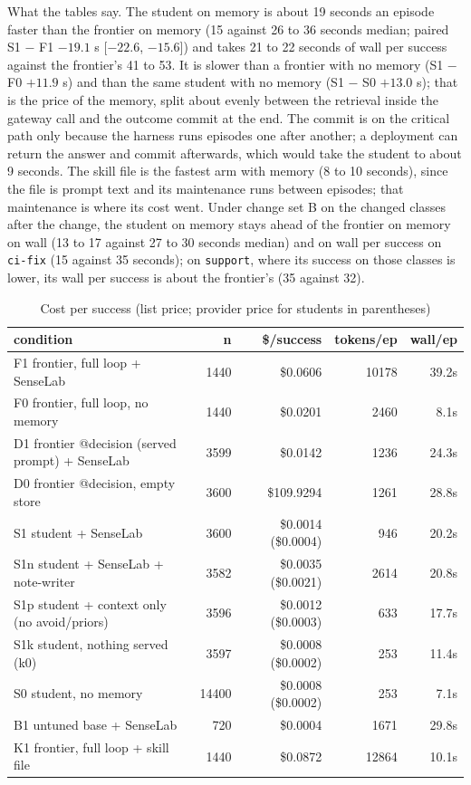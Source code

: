 \documentclass[11pt]{article}
\newcommand{\arm}[1]{\texttt{#1}}
\begin{document}
What the tables say. The student on memory is about 19 seconds an episode faster than the
frontier on memory (15 against 26 to 36 seconds median; paired S1 $-$ F1 $-19.1$ s
[$-22.6$, $-15.6$]) and takes 21 to 22 seconds of wall per success against the frontier's
41 to 53. It is slower than a frontier with no memory (S1 $-$ F0 $+11.9$ s) and than the
same student with no memory (S1 $-$ S0 $+13.0$ s); that is the price of the memory, split
about evenly between the retrieval inside the gateway call and the outcome commit at the
end. The commit is on the critical path only because the harness runs episodes one after
another; a deployment can return the answer and commit afterwards, which would take the
student to about 9 seconds. The skill file is the fastest arm with memory (8 to 10 seconds),
since the file is prompt text and its maintenance runs between episodes; that maintenance is
where its cost went. Under change set B on the changed classes after the change, the student
on memory stays ahead of the frontier on memory on wall (13 to 17 against 27 to 30 seconds
median) and on wall per success on \arm{ci-fix} (15 against 35 seconds); on \arm{support},
where its success on those classes is lower, its wall per success is about the frontier's
(35 against 32).

\begin{table}[H]
\centering\scriptsize
\begin{tabular}{lrrrr}
\toprule
\textbf{condition} & \textbf{n} & \textbf{\$/success} & \textbf{tokens/ep} & \textbf{wall/ep} \\
\midrule
F1 frontier, full loop + SenseLab & 1440 & \$0.0606 & 10178 & 39.2s \\
F0 frontier, full loop, no memory & 1440 & \$0.0201 & 2460 & 8.1s \\
D1 frontier @decision (served prompt) + SenseLab & 3599 & \$0.0142 & 1236 & 24.3s \\
D0 frontier @decision, empty store & 3600 & \$109.9294 & 1261 & 28.8s \\
S1 student + SenseLab & 3600 & \$0.0014 (\$0.0004) & 946 & 20.2s \\
S1n student + SenseLab + note-writer & 3582 & \$0.0035 (\$0.0021) & 2614 & 20.8s \\
S1p student + context only (no avoid/priors) & 3596 & \$0.0012 (\$0.0003) & 633 & 17.7s \\
S1k student, nothing served (k0) & 3597 & \$0.0008 (\$0.0002) & 253 & 11.4s \\
S0 student, no memory & 14400 & \$0.0008 (\$0.0002) & 253 & 7.1s \\
B1 untuned base + SenseLab & 720 & \$0.0004 & 1671 & 29.8s \\
K1 frontier, full loop + skill file & 1440 & \$0.0872 & 12864 & 10.1s \\
\bottomrule
\end{tabular}
\caption{Cost per success (list price; provider price for students in parentheses)}
\label{tab:cost}
\end{table}
\end{document}
